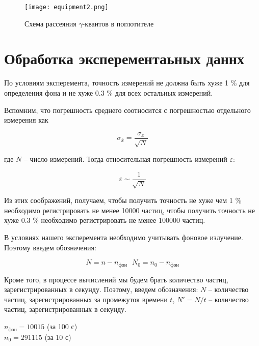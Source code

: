     \begin{figure}
        \centering
        \texttt{[image: equipment2.png]}
        \caption{Схема рассеяния $\gamma$-квантов в поглотителе}
        \label{fig:ustanovka2}
    \end{figure}

    \section*{Обработка эксперементаьных даннх}

    По условиям эксперемента, точность измерений не должна быть хуже 1 \% для 
    определения фона и не хуже 0.3 \% для всех остальных измерений.

    Вспомним, что погрешность среднего соотносится с погрешностью отдельного измерения как

    \begin{equation*}
        \sigma_{\overline{x}} = \frac{\sigma_x}{\sqrt{N}}
    \end{equation*}

    где $N$ -- число измерений. Тогда относительная погрешность измерений $\varepsilon$:

    \begin{equation*}
        \varepsilon \sim \frac{1}{\sqrt{N}}
    \end{equation*}

    Из этих соображений, получаем, чтобы получить точность не хуже чем 1 \% необходимо
    регистрировать не менее 10000 частиц, чтобы получить точность не хуже 0.3 \% необходимо
    регистрировать не менее 100000 частиц.

    В условиях нашего эксперемента необходимо учитывать фоновое излучение. Поэтому введем обозначения:

    \[ N = n - n_{\text{фон}} ~~~ N_0 = n_0 - n_{\text{фон}} \]

    Кроме того, в процессе вычислений мы будем брать количество частиц, зарегистрированных в секунду.
    Поэтому, введем обозначения: $N$ -- количество частиц, зарегистрированных за промежуток времени $t$,
    $N' = N / t$ -- количество частиц, зарегистрированных в секунду.

    \begin{center}
        $n_{\text{фон}} = 10015$ (за 100 с) \\
        $n_0 = 291115$ (за 10 с)
    \end{center}

    

